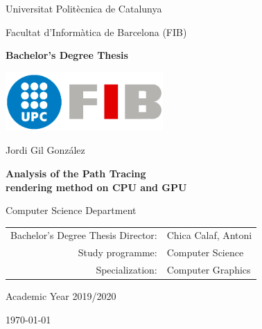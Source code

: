 \newcommand{\HRule}{\rule{\linewidth}{0.5mm}}

\thispagestyle{empty}

\begin{center}

{\large Universitat Politècnica de Catalunya}

\medskip
{\large Facultat d'Informàtica de Barcelona (FIB)}

\vfill
{\bfseries\Large Bachelor's Degree Thesis}

\vfill
\centerline{\mbox{\includegraphics[width=60mm]{media/FIB_UPC.png}}}

\vfill
\vspace{5mm}

{\LARGE Jordi Gil González}

\vspace{15mm}

{\LARGE\bfseries Analysis of the Path Tracing \\ rendering method on CPU and GPU}

\normalfont \small {}

\vfill

Computer Science Department


\vfill

\begin{tabular}{rl}
Bachelor's Degree Thesis Director: & Chica Calaf, Antoni \\
\noalign{\vspace{2mm}}
Study programme: & Computer Science\\
\noalign{\vspace{2mm}}
Specialization: & Computer Graphics\\
\end{tabular}

\vfill

\large Academic Year 2019/2020

\large \today

\end{center}
